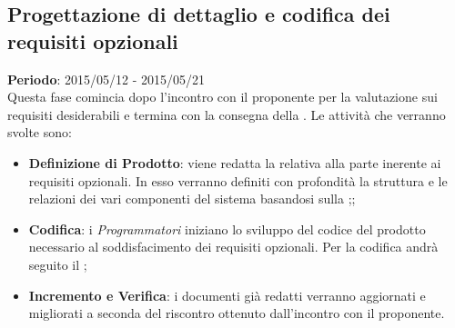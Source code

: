 	\subsection{Progettazione di dettaglio e codifica dei requisiti opzionali} %
	\label{sub:progettazione_di_dettaglio_e_codifica_dei_requisiti_opzionali}
	\textbf{Periodo}:  2015/05/12 - 2015/05/21 \\
	Questa fase comincia dopo l'incontro con il proponente per la valutazione sui requisiti desiderabili e termina con la consegna della \RQ.
	Le attività che verranno svolte sono:
		\begin{itemize}
			\item \textbf{Definizione di Prodotto}: viene redatta la \docNameVersionDdP{} relativa alla parte inerente ai requisiti opzionali. In esso verranno definiti con profondità la struttura e le relazioni dei vari componenti del sistema basandosi sulla \docNameVersionST;;
			\item \textbf{Codifica}: i \emph{Programmatori} iniziano lo sviluppo del codice del prodotto necessario al soddisfacimento dei requisiti opzionali. Per la codifica andrà seguito il \docNameVersionDdP;
			\item \textbf{Incremento e Verifica}: i documenti già redatti verranno aggiornati e migliorati a seconda del riscontro ottenuto dall'incontro con il proponente.
		\end{itemize}
			
